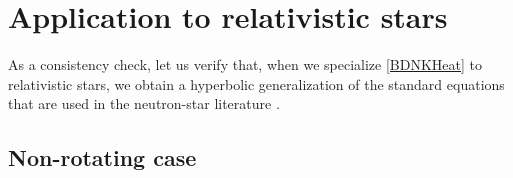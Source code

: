 \documentclass[a4paper, amsfonts, amssymb, amsmath, reprint, showkeys, nofootinbib, twoside, onecolumn,notitlepage]{revtex4-1}
\newcommand{\K}{{\mathcal{K}}}
\theoremstyle{definition}
\theoremstyle{theorem}
\begin{document}



\section{Application to relativistic stars}

As a consistency check, let us verify that, when we specialize \eqref{BDNKHeat} to relativistic stars, we obtain a hyperbolic generalization of the standard equations that are used in the neutron-star literature \cite{Schaab:1998ed,Negreiros2012,Yakovlev:2004iq,Potekhin:2015qsa,Beznogov:2022wae,Miralles1993}.

\subsection{Non-rotating case}
\end{document}
